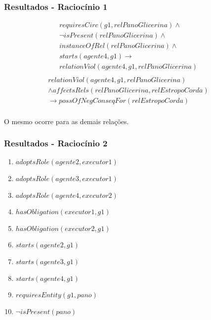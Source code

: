 \documentclass{beamer}
\begin{document}
\begin{frame}
	\frametitle{Resultados - Raciocínio 1}
	\begin{eqnarray}\nonumber
		requiresCirc(g1,relPanoGlicerina) \wedge \nonumber \\  
		\neg isPresent(relPanoGlicerina) \wedge \nonumber \\   
		instanceOfRel(relPanoGlicerina) \wedge \nonumber \\   
		starts(agente4,g1) \to \nonumber \\
		relationViol(agente4,g1,relPanoGlicerina) \nonumber \\  
	\end{eqnarray}
	\begin{eqnarray} \nonumber
		relationViol(agente4,g1,relPanoGlicerina) \nonumber \\
		\wedge affectsRels(relPanoGlicerina,relEstropoCorda) \nonumber \\
    	\to possOfNegConseqFor(relEstropoCorda) \nonumber \\
	\end{eqnarray}

	O mesmo ocorre para as demais relações.
\end{frame}
\begin{frame}
	\frametitle{Resultados - Raciocínio 2}
	\begin{enumerate}
		\item $adoptsRole(agente2,executor1)$ 
		\item $adoptsRole(agente3,executor1)$	 	
		\item $adoptsRole(agente4,executor2)$	 
		\item $hasObligation(executor1,g1)$
		\item $hasObligation(executor2,g1)$
		\item $starts(agente2,g1)$ 
		\item $starts(agente3,g1)$	 	
		\item $starts(agente4,g1)$	
		\item $requiresEntity(g1,pano)$		
		\item $\neg isPresent(pano)$
	\end{enumerate}
\end{frame}
\end{document}
